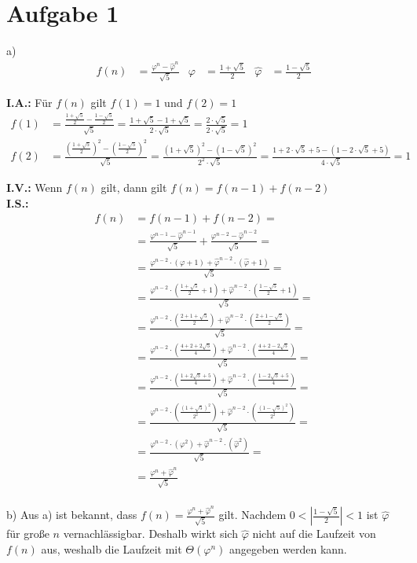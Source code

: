 \section*{Aufgabe 1}
a) 
\begin{align*}
	f(n) &= \frac{\varphi^n - \hat{\varphi}^n}{\sqrt{5}} & \varphi &= \frac{1 + \sqrt{5}}{2} & \hat{\varphi} &= \frac{1 - \sqrt{5}}{2}
\end{align*}

\textbf{I.A.:} Für $f(n)$ gilt $f(1) = 1$ und $f(2) = 1$
\begin{align*}
    f(1) &= \frac{\frac{1 + \sqrt{5}}{2} - \frac{1 - \sqrt{5}}{2}}{\sqrt{5}} = \frac{1 + \sqrt{5} - 1 + \sqrt{5}}{2 \cdot \sqrt{5}} = \frac{2 \cdot \sqrt{5}}{2 \cdot \sqrt{5}} = 1 \\[0.5cm]
%
    f(2) &= \frac{\left( \frac{1 + \sqrt{5}}{2} \right)^2 - \left( \frac{1 - \sqrt{5}}{2} \right)^2}{\sqrt{5}} = \frac{\left( 1 + \sqrt{5} \right)^2 - \left( 1 - \sqrt{5} \right)^2}{2^2 \cdot \sqrt{5}} = \frac{1 + 2 \cdot \sqrt{5} + 5 - (1 - 2 \cdot \sqrt{5} + 5)}{4 \cdot \sqrt{5}} = 1
\end{align*}
    
\textbf{I.V.:} Wenn $f(n)$ gilt, dann gilt $f(n) = f(n - 1) + f(n - 2)$ \\
\textbf{I.S.:}
\begin{align*}
	f(n) &= f(n - 1) + f(n - 2) = \\
    &= \frac{\varphi^{n - 1} - \hat{\varphi}^{n - 1}}{\sqrt{5}} + \frac{\varphi^{n - 2} - \hat{\varphi}^{n - 2}}{\sqrt{5}} = \\
    &= \frac{\varphi^{n - 2} \cdot (\varphi + 1) + \hat{\varphi}^{n - 2} \cdot (\hat{\varphi} + 1)}{\sqrt{5}} = \\
    &= \frac{\varphi^{n - 2} \cdot (\frac{1 + \sqrt{5}}{2} + 1) + \hat{\varphi}^{n - 2} \cdot (\frac{1 - \sqrt{5}}{2} + 1)}{\sqrt{5}} = \\
    &= \frac{\varphi^{n - 2} \cdot (\frac{2 + 1 + \sqrt{5}}{2}) + \hat{\varphi}^{n - 2} \cdot (\frac{2 + 1 - \sqrt{5}}{2})}{\sqrt{5}} = \\
    &= \frac{\varphi^{n - 2} \cdot (\frac{4 + 2 + 2\sqrt{5}}{4}) + \hat{\varphi}^{n - 2} \cdot (\frac{4 + 2 - 2\sqrt{5}}{4})}{\sqrt{5}} = \\
    &= \frac{\varphi^{n - 2} \cdot (\frac{1 + 2\sqrt{5} + 5}{4}) + \hat{\varphi}^{n - 2} \cdot (\frac{1 - 2\sqrt{5} + 5}{4})}{\sqrt{5}} = \\
    &= \frac{\varphi^{n - 2} \cdot (\frac{(1 + \sqrt{5})^2}{2^2}) + \hat{\varphi}^{n - 2} \cdot (\frac{(1 - \sqrt{5})^2}{2^2})}{\sqrt{5}} = \\
    &= \frac{\varphi^{n - 2} \cdot (\varphi^2) + \hat{\varphi}^{n - 2} \cdot (\hat{\varphi}^2)}{\sqrt{5}} = \\
    &= \frac{\varphi^n + \hat{\varphi}^n}{\sqrt{5}}
\end{align*}
\nuffsaid \\[0.5cm]

b) Aus a) ist bekannt, dass $f(n) = \frac{\varphi^n + \hat{\varphi}^n}{\sqrt{5}}$ gilt. Nachdem $0 < |\frac{1 - \sqrt{5}}{2}| < 1$ ist $\hat{\varphi}$ für große $n$ vernachlässigbar. Deshalb wirkt sich $\hat{\varphi}$ nicht auf die Laufzeit von $f(n)$ aus, weshalb die Laufzeit mit $\Theta(\varphi^n)$ angegeben werden kann.  